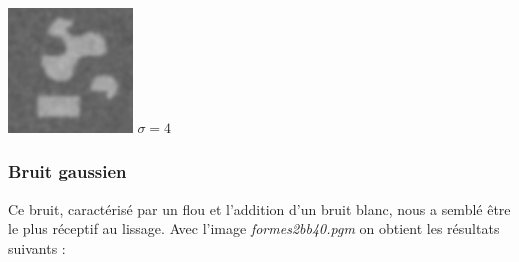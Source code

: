 \documentclass[a4,12pt]{article}
\begin{document}
\begin{minipage}[c]{0.20\linewidth}
	\begin{center}
		\includegraphics[width = 33mm]{./img/2bb50-4.jpg}
		\textit{$\sigma = 4$}
	\end{center}
\end{minipage}


\subsubsection*{Bruit gaussien}
Ce bruit, caractérisé par un flou et l'addition d'un bruit blanc, nous a semblé être le plus réceptif au lissage. Avec l'image \textit{formes2bb40.pgm} on obtient les résultats suivants :
\end{document}
